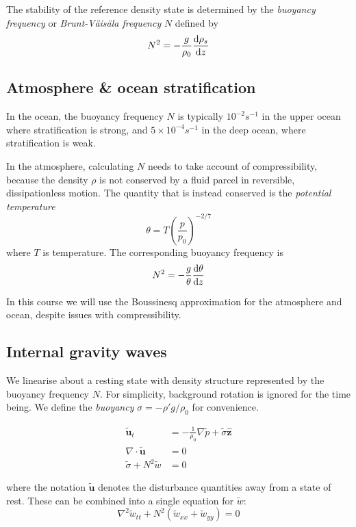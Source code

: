 \documentclass{jknotes}
\begin{document}
The stability of the reference density state is determined by the
\emph{buoyancy frequency} or \emph{Brunt-V\"{a}is\"{a}la frequency} $N$
defined by
\begin{equation}
	N^2 = -\frac{g}{\rho_0} \frac{\diffd \rho_s}{\diffd z}
\end{equation}

\subsection{Atmosphere \& ocean stratification}
In the ocean, the buoyancy frequency $N$ is typically $10^{-2} s^{-1}$ in the
upper ocean where stratification is strong, and $5 \times 10^{-4} s^{-1}$ in
the deep ocean, where stratification is weak.

In the atmosphere, calculating $N$ needs to take account of compressibility,
because the density $\rho$ is not conserved by a fluid parcel in reversible,
dissipationless motion. The quantity that is instead conserved is the
\emph{potential temperature}
\begin{equation}
	\theta = T \left(\frac{p}{p_0}\right)^{-2/7}
\end{equation}
where $T$ is temperature. The corresponding buoyancy frequency is
\begin{equation}
	N^2 = -\frac{g}{\theta} \frac{\diffd \theta}{\diffd z}
\end{equation}

In this course we will use the Boussinesq approximation for the atmosphere and
ocean, despite issues with compressibility.

\subsection{Internal gravity waves}
We linearise about a resting state with density structure represented by the
buoyancy frequency $N$. For simplicity, background rotation is ignored for the
time being. We define the \emph{buoyancy} $\sigma = -\rho' g/\rho_0$ for
convenience.

\begin{align}
	\tilde{\symbf{u}}_t &= -\frac{1}{\rho_0} \nabla \tilde{p} + \tilde{\sigma}
	\hat{\symbf{z}} \\
	\nabla \cdot \tilde{\symbf{u}} &= 0 \\
	\tilde{\sigma} + N^2 \tilde{w} &= 0
\end{align}

where the notation $\tilde{\symbf{u}}$ denotes the disturbance quantities away from a
state of rest. These can be combined into a single equation for $\tilde{w}$:
\begin{equation}
	\nabla^2 \tilde{w}_{tt} + N^2(\tilde{w}_{xx} + \tilde{w}_{yy}) = 0
\end{equation}
\end{document}
